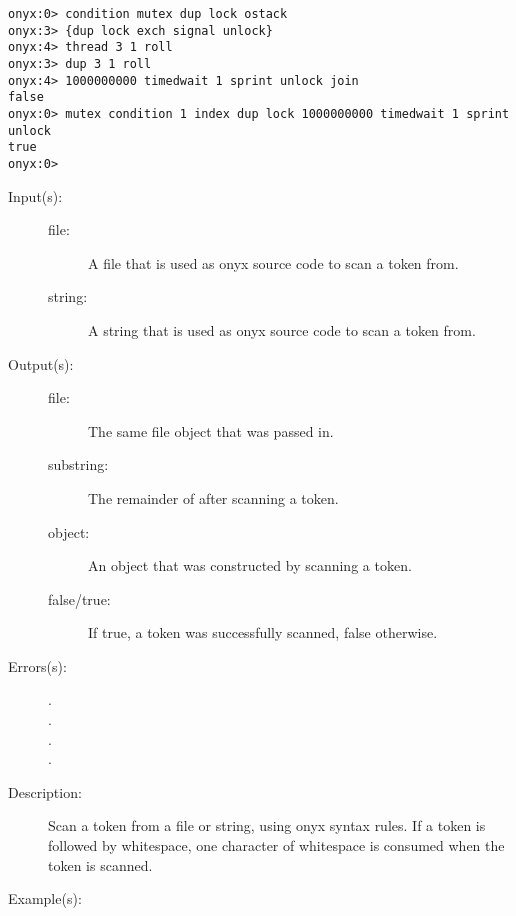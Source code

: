 \begin{description}
\begin{description}
\begin{verbatim}
onyx:0> condition mutex dup lock ostack
onyx:3> {dup lock exch signal unlock}
onyx:4> thread 3 1 roll
onyx:3> dup 3 1 roll
onyx:4> 1000000000 timedwait 1 sprint unlock join
false
onyx:0> mutex condition 1 index dup lock 1000000000 timedwait 1 sprint unlock
true
onyx:0>
		\end{verbatim}
	\end{description}
\label{systemdict:token}
\item[{\onyxop{file/string}{token}{false}}: ]
\item[{\onyxop{file/string}{token}{file/substring object true}}: ]
	\begin{description}\item[]
	\item[Input(s): ]
		\begin{description}\item[]
		\item[file: ]
			A file that is used as onyx source code to scan a token
			from.
		\item[string: ]
			A string that is used as onyx source code to scan a
			token from.
		\end{description}
	\item[Output(s): ]
		\begin{description}\item[]
		\item[file: ]
			The same file object that was passed in.
		\item[substring: ]
			The remainder of  after scanning a token.
		\item[object: ]
			An object that was constructed by scanning a token.
		\item[false/true: ]
			If true, a token was successfully scanned, false
			otherwise.
		\end{description}
	\item[Errors(s): ]
		\begin{description}\item[]
		\item[.]
		\item[.]
		\item[.]
		\item[.]
		\end{description}
	\item[Description: ]
		Scan a token from a file or string, using onyx syntax rules.  If
		a token is followed by whitespace, one character of whitespace
		is consumed when the token is scanned.
	\item[Example(s): ]\begin{verbatim}


\end{verbatim}
\end{description}
\end{description}
